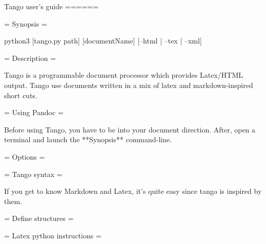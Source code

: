 Tango user's guide
======


= Synopsis =

python3 [tango.py path] [documentName] [--html | --tex | --xml]


= Description =

Tango is a programmable document processor which provides Latex/HTML output.
Tango use documents written in a mix of latex and markdown-inspired short cuts.


= Using Pandoc =

Before using Tango, you have to be into your document direction.
After, open a terminal and launch the **Synopsis** command-line.

= Options =




= Tango syntax =


If you get to know Markdown and Latex, it's quite easy since tango is inspired by them.



= Define structures =





= Latex python instructions =


